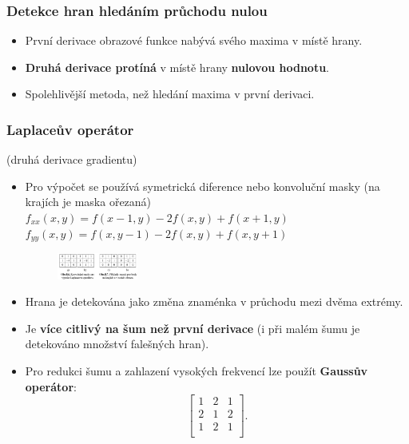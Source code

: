 \subsubsection{Detekce hran hledáním průchodu nulou}
\begin{itemize}
	\item První derivace obrazové funkce nabývá svého maxima v místě hrany.
	\item \textbf{Druhá derivace protíná} v místě hrany \textbf{nulovou hodnotu}.
	\item Spolehlivější metoda, než hledání maxima v první derivaci.
\end{itemize}
\subsubsection*{Laplaceův operátor} (druhá derivace gradientu)
\begin{itemize}
	\item Pro výpočet se používá symetrická diference nebo konvoluční masky (na krajích je maska ořezaná)\\
	$f_{xx}(x,y) = f(x-1,y) - 2f(x,y) + f(x+1,y)$
	$f_{yy}(x,y) = f(x,y-1) - 2f(x,y) + f(x,y+1)$
	 		\begin{figure}[H]
 	\begin{center}
	\includegraphics[width=0.25\textwidth]{assets/8_priklady_laplace}
	\end{center}
	\end{figure}
	\item Hrana je detekována jako změna znaménka v průchodu mezi dvěma extrémy.
	\item Je \textbf{více citlivý na šum než první derivace} (i při malém šumu je detekováno množství falešných hran).
	\item Pro redukci šumu a zahlazení vysokých frekvencí lze použít \textbf{Gaussův operátor}:
			\begin{equation*}
	 			\begin{bmatrix}
     			 1 &  2  &  1      \\[0.3em]
     			 2 &  1  &  2      \\[0.3em]
     			 1 &  2  &  1      \\
     			\end{bmatrix}.
			\end{equation*}
\end{itemize}
